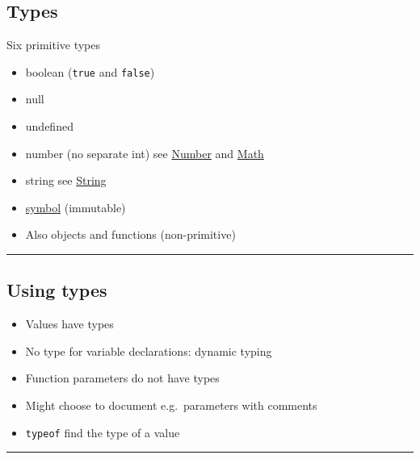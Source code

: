 \hypertarget{types}{%
\subsection{Types}\label{types}}

Six primitive types

\begin{itemize}
\tightlist
\item
  boolean (\texttt{true} and \texttt{false})
\item
  null
\item
  undefined
\item
  number (no separate int) see
  \href{https://developer.mozilla.org/en-US/docs/Web/JavaScript/Reference/Global_Objects/Number}{Number}
  and
  \href{https://developer.mozilla.org/en-US/docs/Web/JavaScript/Reference/Global_Objects/Math}{Math}
\item
  string see
  \href{https://developer.mozilla.org/en-US/docs/Web/JavaScript/Reference/Global_Objects/String}{String}
\item
  \href{https://developer.mozilla.org/en-US/docs/Glossary/Symbol}{symbol}
  (immutable)
\item
  Also objects and functions (non-primitive)
\end{itemize}

\begin{center}\rule{0.5\linewidth}{\linethickness}\end{center}

\hypertarget{using-types}{%
\subsection{Using types}\label{using-types}}

\begin{itemize}
\tightlist
\item
  Values have types
\item
  No type for variable declarations: dynamic typing
\item
  Function parameters do not have types
\item
  Might choose to document e.g.~parameters with comments
\item
  \texttt{typeof} find the type of a value
\end{itemize}

\begin{center}\rule{0.5\linewidth}{\linethickness}\end{center}

